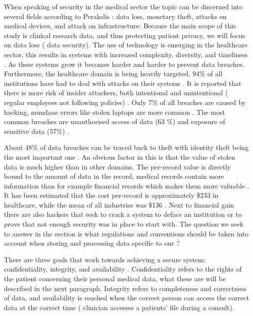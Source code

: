 When speaking of security in the medical sector the topic can be discerned into several fields according to Perakslis \cite{s2Perakslis2014}: data loss, monetary theft, attacks on medical devices, and attack on infrastructure.
Because the main scope of this study is clinical research data, and thus protecting patient privacy, we will focus on data loss (\ie{} data security).
The use of technology is emerging in the healthcare sector, this results in systems with increased complexity, diversity, and timeliness \cite{s13Patil2014}.
As these systems grow it becomes harder and harder to prevent data breaches.
Furthermore, the healthcare domain is being heavily targeted, 94\% of all institutions have had to deal with attacks on their systems \cite{s2Perakslis2014}.
It is reported that there is more risk of insider attackers, both intentional and unintentional (\eg{} regular employees not following policies) \cite{s1Zamosky2014}.
Only 7\% of all breaches are caused by hacking, mundane errors like stolen laptops are more common \cite{s1Zamosky2014}.
The most common breaches are unauthorised access of data (63 \%) and exposure of sensitive data (57\%) \cite{s18Kum2014}.

About 48\% of data breaches can be traced back to theft with identity theft being the most important one \cite{s1Zamosky2014}.
An obvious factor in this is that the value of stolen data is much higher than in other domains.
The per-record value is directly bound to the amount of data in the record, medical records contain more information than for example financial records which makes them more valuable \cite{s1Zamosky2014}.
It has been estimated that the cost per-record is approximately \$233 in healthcare, while the mean of all industries was \$136 \cite{s2Perakslis2014}.
Next to financial gain there are also hackers that seek to crack a system to deface an institution or to prove that not enough security was in place to start with.
The question we seek to answer in the section is what regulations and conventions should be taken into account when storing and processing data specific to our \ivfsystem{}?

There are three goals that work towards achieving a secure system: confidentiality, integrity, and availability \cite{s8FernandezAleman2013}.
Confidentiality refers to the rights of the patient concerning their personal medical data, what these are will be described in the next paragraph.
Integrity refers to completeness and correctness of data, and availability is reached when the correct person can access the correct data at the correct time (\eg{} clinician accesses a patients' file during a consult).

